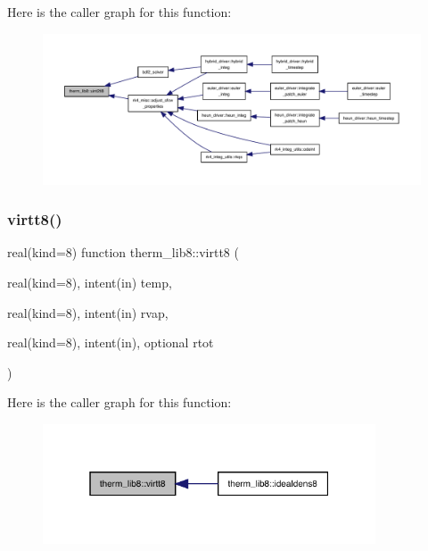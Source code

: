 Here is the caller graph for this function\+:
\nopagebreak
\begin{figure}[H]
\begin{center}
\leavevmode
\includegraphics[width=350pt]{namespacetherm__lib8_a25d3d7f68a7ddbdf3c13eac03b1bb780_icgraph}
\end{center}
\end{figure}
\mbox{\label{namespacetherm__lib8_a84cb0b0932922178e82afb8a5f9627ad}} 
\subsubsection{\texorpdfstring{virtt8()}{virtt8()}}
{\footnotesize\ttfamily real(kind=8) function therm\+\_\+lib8\+::virtt8 (\begin{DoxyParamCaption}\item[{real(kind=8), intent(in)}]{temp,  }\item[{real(kind=8), intent(in)}]{rvap,  }\item[{real(kind=8), intent(in), optional}]{rtot }\end{DoxyParamCaption})}

Here is the caller graph for this function\+:
\nopagebreak
\begin{figure}[H]
\begin{center}
\leavevmode
\includegraphics[width=280pt]{namespacetherm__lib8_a84cb0b0932922178e82afb8a5f9627ad_icgraph}
\end{center}
\end{figure}
\mbox{\label{namespacetherm__lib8_a1f7ea92fca9ac1740028a6781997e12f}} 
